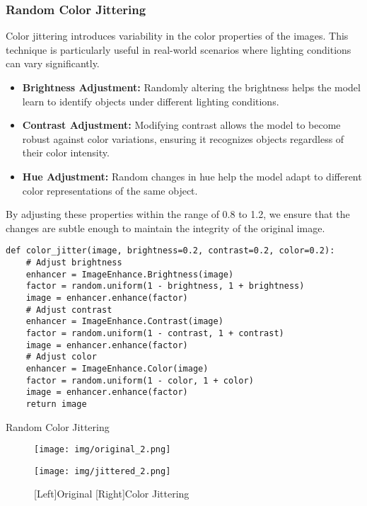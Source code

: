 \documentclass[a4paper,11pt]{article}
\begin{document}
\subsubsection{Random Color Jittering}
Color jittering introduces variability in the color properties of the images. This technique is particularly useful in real-world scenarios where lighting conditions can vary significantly. 
\begin{itemize}
    \item \textbf{Brightness Adjustment:} Randomly altering the brightness helps the model learn to identify objects under different lighting conditions. 
    \item \textbf{Contrast Adjustment:} Modifying contrast allows the model to become robust against color variations, ensuring it recognizes objects regardless of their color intensity.
    \item \textbf{Hue Adjustment:} Random changes in hue help the model adapt to different color representations of the same object.
\end{itemize}
By adjusting these properties within the range of 0.8 to 1.2, we ensure that the changes are subtle enough to maintain the integrity of the original image.

\begin{listing}[!ht]
\begin{verbatim}
def color_jitter(image, brightness=0.2, contrast=0.2, color=0.2):
    # Adjust brightness
    enhancer = ImageEnhance.Brightness(image)
    factor = random.uniform(1 - brightness, 1 + brightness)
    image = enhancer.enhance(factor)
    # Adjust contrast
    enhancer = ImageEnhance.Contrast(image)
    factor = random.uniform(1 - contrast, 1 + contrast)
    image = enhancer.enhance(factor)
    # Adjust color
    enhancer = ImageEnhance.Color(image)
    factor = random.uniform(1 - color, 1 + color)
    image = enhancer.enhance(factor)
    return image
\end{verbatim}
\caption{Random Color Jittering}
\label{listing:python}
\end{listing}

\begin{figure}[ht]
    \centering
    \begin{minipage}{0.49\textwidth}
        \texttt{[image: img/original\_2.png]}
    \end{minipage}
    \hfill
    \begin{minipage}{0.49\textwidth}
        \texttt{[image: img/jittered\_2.png]}
    \end{minipage}
    \caption{[Left]Original [Right]Color Jittering}
\end{figure}
\end{document}
